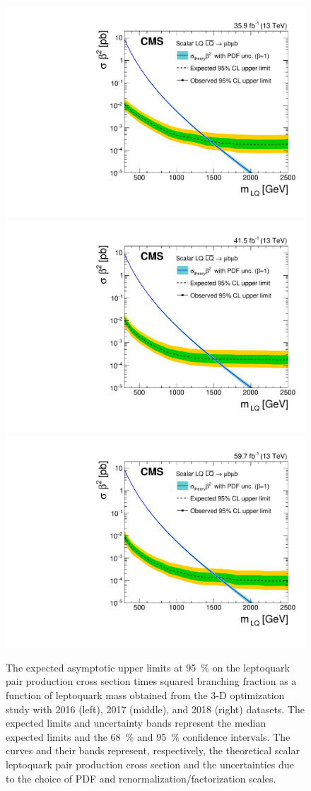 \begin{figure}[H]
    \centering
    {\includegraphics[width=.32\textwidth]{Images/Analysis/3D_Opt_Limits/BR_Sigma_MuMu_2016.pdf}}
    {\includegraphics[width=.32\textwidth]{Images/Analysis/3D_Opt_Limits/BR_Sigma_MuMu_2017.pdf}}
    {\includegraphics[width=.32\textwidth]{Images/Analysis/3D_Opt_Limits/BR_Sigma_MuMu_2018.pdf}}
    \caption{The expected asymptotic upper limits at \SI{95}{\%} \CL on the leptoquark pair production cross section times squared branching fraction as a function of leptoquark mass obtained from the 3-D optimization study with 2016 (left), 2017 (middle), and 2018 (right) datasets. The expected limits and uncertainty bands represent the median expected limits and the \SI{68}{\%} and \SI{95}{\%} confidence intervals. The \xsecTheory curves and their bands represent, respectively, the theoretical scalar leptoquark pair production cross section and the uncertainties due to the choice of PDF and renormalization/factorization scales.}
    \label{figapp:cutandcountlimits}
\end{figure}

